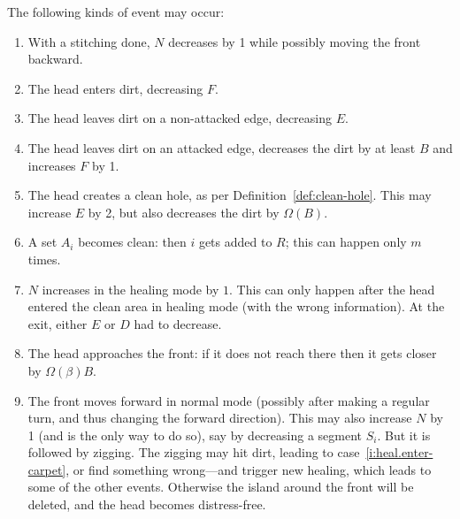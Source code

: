 \documentclass[12pt]{memoir}
\def\B{B}
\begin{document}
\begin{Proof}
The following kinds of event may occur:
\begin{enumerate}[label=\upshape{(h\arabic*)}, ref=h\arabic*]

\item\label{i:heal.N-decr} With a stitching done, \( N \) decreases by 1 while possibly 
moving the front backward.

\item\label{i:heal.enter-carpet} The head enters dirt, decreasing \( F \).

\item\label{i:heal.leave-carpet.E}
The head leaves dirt on a non-attacked edge, decreasing \( E \).

\item\label{i:heal.leave-carpet.F}
The head leaves dirt on an attacked edge, decreases the dirt by at least \( \B \) and
increases \( F \) by 1.

\item\label{i:heal.hole}
The head creates a clean hole, as per Definition~\ref{def:clean-hole}.
This may increase \( E \) by 2, but also decreases the dirt by \( \Omega(\B) \).

\item\label{i:heal.clean}
A set \( A_{i} \) becomes clean: then \( i \) gets added to \( R \); 
this can happen only \( m \) times.

\item\label{i:heal.N-incr.healing}
\( N \) increases in the healing mode by \( 1 \).
This can only happen after the head entered the clean area in healing mode (with the wrong information).
At the exit, either \( E \) or \( D \) had to decrease.

\item\label{i:heal.approach-front} 
The head approaches the front: if it does not reach there then it gets closer by  
 \( \Omega(\beta)\B \).

\item\label{i:heal.front-move} The front moves forward in normal mode
(possibly after making a regular turn, and thus changing the forward direction).
This may also increase \( N \) by 1 (and is the only way to do so), 
say by decreasing a segment \( S_{i} \).
But it is followed by zigging.
The zigging may hit dirt, leading to case~\eqref{i:heal.enter-carpet},
or find something wrong---and trigger new healing, which leads to some of the other events.
Otherwise the island around the front will be deleted, and the head becomes distress-free.
\end{enumerate}


\end{Proof}
\end{document}
